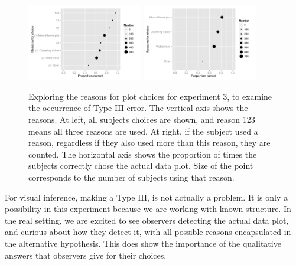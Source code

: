 \documentclass[12pt]{article}
\newcommand{\blue}[1]{{\color{blue} #1}} %
\newcommand{\green}[1]{{\color{green} #1}} %
\newcommand{\hh}[1]{{\color{orange} #1}} %
\begin{document}


\begin{figure}[hbtp]
   \centering
       \includegraphics[width=0.45\textwidth]{choice_reason2.pdf}
       \includegraphics[width=0.45\textwidth]{choice_reason3.pdf}
       \caption{Exploring the reasons for plot choices for experiment 3, to examine the occurrence of Type III error. The vertical axis shows the reasons. At left, all subjects choices are shown, and reason 123 means all three reasons are used. At right, if the subject used a reason, regardless if they also used more than this reason, they are counted. The horizontal axis shows the proportion of times the subjects correctly chose the actual data plot. Size of the point corresponds to the number of subjects using that reason.}
       \label{fig:choice_reason}
\end{figure}

For visual inference, making a Type III, is not actually a problem. It is only a possibility in this experiment because we are working with known structure. In the real setting, we are excited to see observers detecting the actual data plot, and curious about how they detect it, with all possible reasons encapsulated in the alternative hypothesis. This does show the importance of the qualitative answers that observers give for their choices.
\end{document}
